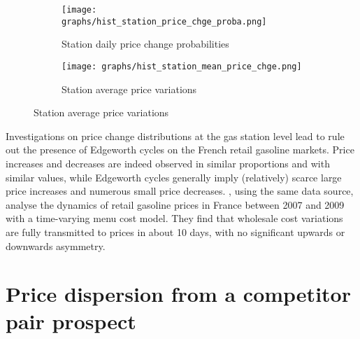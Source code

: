 \documentclass[english]{article}
\begin{document}
\begin{figure}[htb!]
\centering
\caption{Histograms of station price changes}
\begin{subfigure}{.49\textwidth}
\centering
\texttt{[image: graphs/hist\_station\_price\_chge\_proba.png]}
\caption[short]{Station daily price change probabilities}
\label{fig:hist_station_price_chge_proba}
\end{subfigure}
\begin{subfigure}{.49\textwidth}
\centering
\texttt{[image: graphs/hist\_station\_mean\_price\_chge.png]}
\caption[short]{Station average price variations}
\label{fig:hist_station_mean_price_chge}
\end{subfigure}
\end{figure}

Investigations on price change distributions at the gas station level lead to rule out the presence of Edgeworth cycles on the French retail gasoline markets. Price increases and decreases are indeed observed in similar proportions and with similar values, while Edgeworth cycles generally imply (relatively) scarce large price increases and numerous small price decreases. \cite{GAU15}, using the same data source, analyse the dynamics of retail gasoline prices in France between 2007 and 2009 with a time-varying menu cost model. They find that wholesale cost variations are fully transmitted to prices in about 10 days, with no significant upwards or downwards asymmetry.

\section{Price dispersion from a competitor pair prospect}
\end{document}
